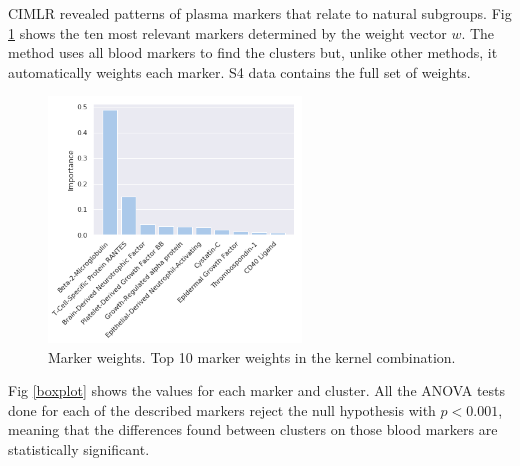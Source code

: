 CIMLR revealed patterns of plasma markers that relate to natural subgroups. Fig \ref{markers_imp} shows the ten most relevant markers determined by the weight vector $w$. The method uses all blood markers to find the clusters but, unlike other methods, it automatically weights each marker. S4 data contains the full set of weights.   \\

\begin{figure}[!htbp]
\centering
\includegraphics[width=0.6\textwidth]{figures/cimlr/cluster_importance.png}
\caption[Marker weights.]{Marker weights. Top 10 marker weights in the kernel combination.}
\label{markers_imp}
\end{figure}

Fig \ref{boxplot} shows the values for each marker and cluster. All the ANOVA tests done for each of the described markers reject the null hypothesis with $p<0.001$, meaning that the differences found between clusters on those blood markers are statistically significant.  \\

